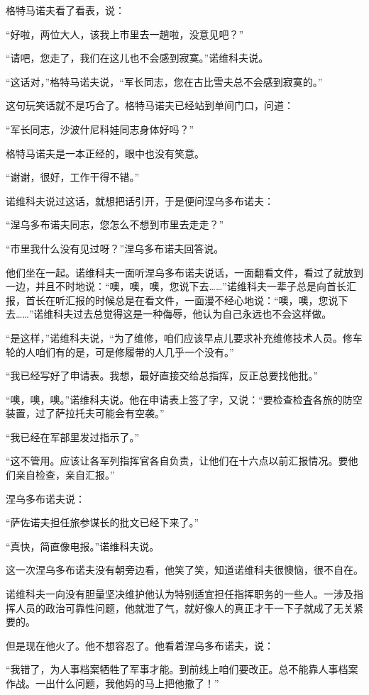 格特马诺夫看了看表，说：

“好啦，两位大人，该我上市里去一趟啦，没意见吧？”

“请吧，您走了，我们在这儿也不会感到寂寞。”诺维科夫说。

“这话对，”格特马诺夫说，“军长同志，您在古比雪夫总不会感到寂寞的。”

这句玩笑话就不是巧合了。格特马诺夫已经站到单间门口，问道：

“军长同志，沙波什尼科娃同志身体好吗？”

格特马诺夫是一本正经的，眼中也没有笑意。

“谢谢，很好，工作干得不错。”

诺维科夫说过这话，就想把话引开，于是便问涅乌多布诺夫：

“涅乌多布诺夫同志，您怎么不想到市里去走走？”

“市里我什么没有见过呀？”涅乌多布诺夫回答说。

他们坐在一起。诺维科夫一面听涅乌多布诺夫说话，一面翻看文件，看过了就放到一边，并且不时地说：“噢，噢，噢，您说下去……”诺维科夫一辈子总是向首长汇报，首长在听汇报的时候总是在看文件，一面漫不经心地说：“噢，噢，您说下去……”诺维科夫过去总觉得这是一种侮辱，他认为自己永远也不会这样做。

“是这样，”诺维科夫说，“为了维修，咱们应该早点儿要求补充维修技术人员。修车轮的人咱们有的是，可是修履带的人几乎一个没有。”

“我已经写好了申请表。我想，最好直接交给总指挥，反正总要找他批。”

“噢，噢，噢。”诺维科夫说。他在申请表上签了字，又说：“要检查检査各旅的防空装置，过了萨拉托夫可能会有空袭。”

“我已经在军部里发过指示了。”

“这不管用。应该让各军列指挥官各自负责，让他们在十六点以前汇报情况。要他们亲自检查，亲自汇报。”

涅乌多布诺夫说：

“萨佐诺夫担任旅参谋长的批文已经下来了。”

“真快，简直像电报。”诺维科夫说。

这一次涅乌多布诺夫没有朝旁边看，他笑了笑，知道诺维科夫很懊恼，很不自在。

诺维科夫一向没有胆量坚决维护他认为特别适宜担任指挥职务的一些人。一涉及指挥人员的政治可靠性问题，他就泄了气，就好像人的真正才干一下子就成了无关紧要的。

但是现在他火了。他不想容忍了。他看着涅乌多布诺夫，说：

“我错了，为人事档案牺牲了军事才能。到前线上咱们要改正。总不能靠人事档案作战。一出什么问题，我他妈的马上把他撤了！”

